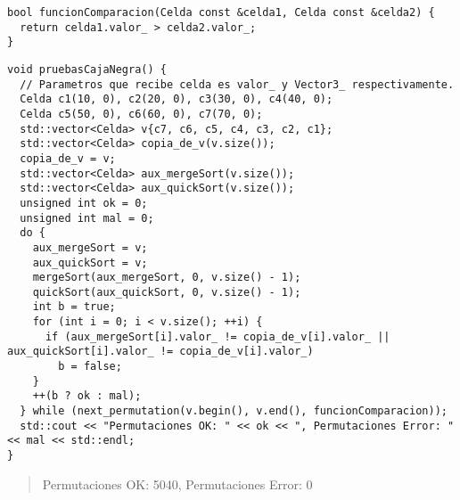 \begin{lstlisting}
bool funcionComparacion(Celda const &celda1, Celda const &celda2) {
  return celda1.valor_ > celda2.valor_;
}

\end{lstlisting}

\begin{lstlisting}
void pruebasCajaNegra() {
  // Parametros que recibe celda es valor_ y Vector3_ respectivamente.
  Celda c1(10, 0), c2(20, 0), c3(30, 0), c4(40, 0);
  Celda c5(50, 0), c6(60, 0), c7(70, 0);
  std::vector<Celda> v{c7, c6, c5, c4, c3, c2, c1};
  std::vector<Celda> copia_de_v(v.size());
  copia_de_v = v;
  std::vector<Celda> aux_mergeSort(v.size());
  std::vector<Celda> aux_quickSort(v.size());
  unsigned int ok = 0;
  unsigned int mal = 0;
  do {
    aux_mergeSort = v;
    aux_quickSort = v;
    mergeSort(aux_mergeSort, 0, v.size() - 1);
    quickSort(aux_quickSort, 0, v.size() - 1);
    int b = true;
    for (int i = 0; i < v.size(); ++i) {
      if (aux_mergeSort[i].valor_ != copia_de_v[i].valor_ || aux_quickSort[i].valor_ != copia_de_v[i].valor_)
        b = false;
    }
    ++(b ? ok : mal);
  } while (next_permutation(v.begin(), v.end(), funcionComparacion));
  std::cout << "Permutaciones OK: " << ok << ", Permutaciones Error: " << mal << std::endl;
}
\end{lstlisting}
\begin{quote}
    Permutaciones OK: 5040, Permutaciones Error: 0    
\end{quote}
